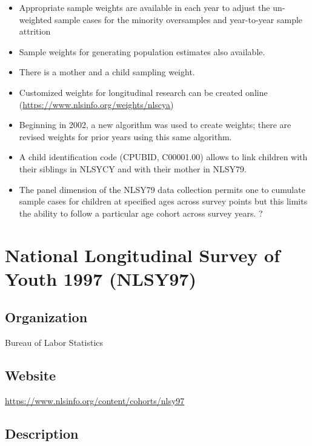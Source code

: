 \documentclass[
]{book}
\providecommand{\tightlist}{%
  \setlength{\itemsep}{0pt}\setlength{\parskip}{0pt}}
\begin{document}
\begin{itemize}
\tightlist
\item
  Appropriate sample weights are available in each year to adjust the un-weighted sample cases for the minority oversamples and year-to-year sample attrition
\item
  Sample weights for generating population estimates also available.
\item
  There is a mother and a child sampling weight.
\item
  Customized weights for longitudinal research can be created online (\url{https://www.nlsinfo.org/weights/nlscya})
\item
  Beginning in 2002, a new algorithm was used to create weights; there are revised weights for prior years using this same algorithm.
\item
  A child identification code (CPUBID, C00001.00) allows to link children with their siblings in NLSYCY and with their mother in NLSY79.
\item
  The panel dimension of the NLSY79 data collection permits one to cumulate sample cases for children at specified ages across survey points but this limits the ability to follow a particular age cohort across survey years. ?
\end{itemize}

\mainmatter

\hypertarget{national-longitudinal-survey-of-youth-1997-nlsy97}{%
\chapter{National Longitudinal Survey of Youth 1997 (NLSY97)}\label{national-longitudinal-survey-of-youth-1997-nlsy97}}

\hypertarget{organization-60}{%
\section{Organization}\label{organization-60}}

Bureau of Labor Statistics

\hypertarget{website-60}{%
\section{Website}\label{website-60}}

\url{https://www.nlsinfo.org/content/cohorts/nlsy97}

\hypertarget{description-60}{%
\section{Description}\label{description-60}}
\end{document}
